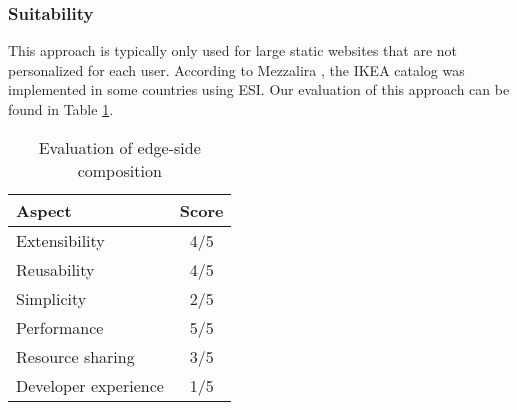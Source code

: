 \subsubsection{Suitability}
This approach is typically only used for large static websites that are not personalized for each user. According to Mezzalira \cite{MezzaliraBuildingMf}, the IKEA catalog was implemented in some countries using ESI. Our evaluation of this approach can be found in Table \ref{table:esi-evaluation}.  

\begin{table}[h]
  \centering
  \begin{tabular}{|p{4cm}|c|}
    \hline
      \textbf{Aspect} & \textbf{Score} \\
    \hline
      Extensibility & 4/5 \\
    \hline
      Reusability & 4/5 \\
    \hline
      Simplicity & 2/5 \\
    \hline
      Performance & 5/5 \\
    \hline
      Resource sharing & 3/5 \\
    \hline
      Developer experience & 1/5 \\
    \hline
  \end{tabular}
  \caption{Evaluation of edge-side composition}
  \label{table:esi-evaluation}
\end{table}


